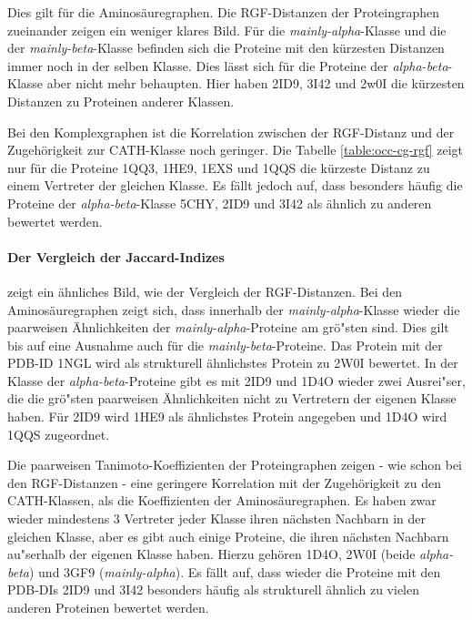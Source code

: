 \documentclass{report}
\begin{document}
Dies gilt f\"ur die Aminos\"auregraphen. Die RGF-Distanzen der Proteingraphen zueinander zeigen ein weniger klares Bild.
F\"ur die \textit{mainly-alpha}-Klasse und die der \textit{mainly-beta}-Klasse befinden sich die Proteine mit den k\"urzesten Distanzen immer noch in der selben Klasse. Dies l\"asst sich f\"ur die Proteine der \textit{alpha-beta}-Klasse aber nicht mehr behaupten. Hier haben 2ID9, 3I42 und 2w0I die k\"urzesten Distanzen zu Proteinen anderer Klassen.

Bei den Komplexgraphen ist die Korrelation zwischen der RGF-Distanz und der Zugeh\"origkeit zur CATH-Klasse noch geringer. Die Tabelle \ref{table:occ-cg-rgf} zeigt nur f\"ur die Proteine 1QQ3, 1HE9, 1EXS und 1QQS die k\"urzeste Distanz zu einem Vertreter der gleichen Klasse.
Es f\"allt jedoch auf, dass besonders h\"aufig die Proteine der \textit{alpha-beta}-Klasse 5CHY, 2ID9 und 3I42 als \"ahnlich zu anderen bewertet werden.

\paragraph{Der Vergleich der Jaccard-Indizes}
zeigt ein \"ahnliches Bild, wie der Vergleich der RGF-Distanzen. Bei den Aminos\"auregraphen zeigt sich, dass innerhalb der \textit{mainly-alpha}-Klasse wieder die paarweisen \"Ahnlichkeiten der \textit{mainly-alpha}-Proteine am gr\"o"sten sind. Dies gilt bis auf eine Ausnahme auch f\"ur die \textit{mainly-beta}-Proteine. Das Protein mit der PDB-ID 1NGL wird als strukturell \"ahnlichstes Protein zu 2W0I bewertet. In der Klasse der \textit{alpha-beta}-Proteine gibt es mit 2ID9 und 1D4O wieder zwei Ausrei"ser, die die gr\"o"sten paarweisen \"Ahnlichkeiten nicht zu Vertretern der eigenen Klasse haben. F\"ur 2ID9 wird 1HE9 als \"ahnlichstes Protein angegeben und 1D4O wird 1QQS zugeordnet.

Die paarweisen Tanimoto-Koeffizienten der Proteingraphen zeigen - wie schon bei den RGF-Distanzen - eine geringere Korrelation mit der Zugeh\"origkeit zu den CATH-Klassen, als die Koeffizienten der Aminos\"auregraphen. Es haben zwar wieder mindestens 3 Vertreter jeder Klasse ihren n\"achsten Nachbarn in der gleichen Klasse, aber es gibt auch einige Proteine, die ihren n\"achsten Nachbarn au"serhalb der eigenen Klasse haben. Hierzu geh\"oren 1D4O, 2W0I (beide \textit{alpha-beta}) und 3GF9 (\textit{mainly-alpha}). Es f\"allt auf, dass wieder die Proteine mit den PDB-DIs 2ID9 und 3I42 besonders h\"aufig als strukturell \"ahnlich zu vielen anderen Proteinen bewertet werden.
\end{document}
